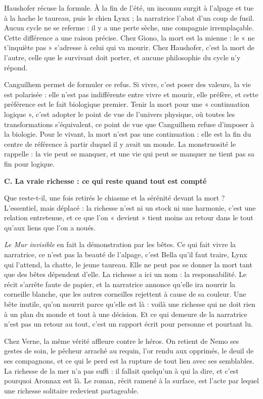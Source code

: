 \documentclass[11pt,a4paper]{article}
\begin{document}
Haushofer récuse la formule. À la fin de l'été, un inconnu surgit à l'alpage et tue à la hache le taureau, puis le chien Lynx ; la narratrice l'abat d'un coup de fusil. Aucun cycle ne se referme : il y a une perte sèche, une compagnie irremplaçable. Cette différence a une raison précise. Chez Giono, la mort est la mienne : le « ne t'inquiète pas » s'adresse à celui qui va mourir. Chez Haushofer, c'est la mort de l'autre, celle que le survivant doit porter, et aucune philosophie du cycle n'y répond.

Canguilhem permet de formuler ce refus. Si vivre, c'est poser des valeurs, la vie est polarisée : elle n'est pas indifférente entre vivre et mourir, elle préfère, et cette préférence est le fait biologique premier. Tenir la mort pour une « continuation logique », c'est adopter le point de vue de l'univers physique, où toutes les transformations s'équivalent, ce point de vue que Canguilhem refuse d'imposer à la biologie. Pour le vivant, la mort n'est pas une continuation : elle est la fin du centre de référence à partir duquel il y avait un monde. La monstruosité le rappelle : la vie peut se manquer, et une vie qui peut se manquer ne tient pas sa fin pour logique.

\textbf{C. La vraie richesse : ce qui reste quand tout est compté}

Que reste-t-il, une fois retirés le chiasme et la sérénité devant la mort ? L'essentiel, mais déplacé : la richesse n'est ni un stock ni une harmonie, c'est une relation entretenue, et ce que l'on « devient » tient moins au retour dans le tout qu'aux liens que l'on a noués.

\emph{Le Mur invisible} en fait la démonstration par les bêtes. Ce qui fait vivre la narratrice, ce n'est pas la beauté de l'alpage, c'est Bella qu'il faut traire, Lynx qui l'attend, la chatte, le jeune taureau. Elle ne peut pas se donner la mort tant que des bêtes dépendent d'elle. La richesse a ici un nom : la responsabilité. Le récit s'arrête faute de papier, et la narratrice annonce qu'elle ira nourrir la corneille blanche, que les autres corneilles rejettent à cause de sa couleur. Une bête inutile, qu'on nourrit parce qu'elle est là : voilà une richesse qui ne doit rien à un plan du monde et tout à une décision. Et ce qui demeure de la narratrice n'est pas un retour au tout, c'est un rapport écrit pour personne et pourtant lu.

Chez Verne, la même vérité affleure contre le héros. On retient de Nemo ses gestes de soin, le pêcheur arraché au requin, l'or rendu aux opprimés, le deuil de ses compagnons, et ce qui le perd est la rupture de tout lien avec ses semblables. La richesse de la mer n'a pas suffi : il fallait quelqu'un à qui la dire, et c'est pourquoi Aronnax est là. Le roman, récit ramené à la surface, est l'acte par lequel une richesse solitaire redevient partageable.
\end{document}
